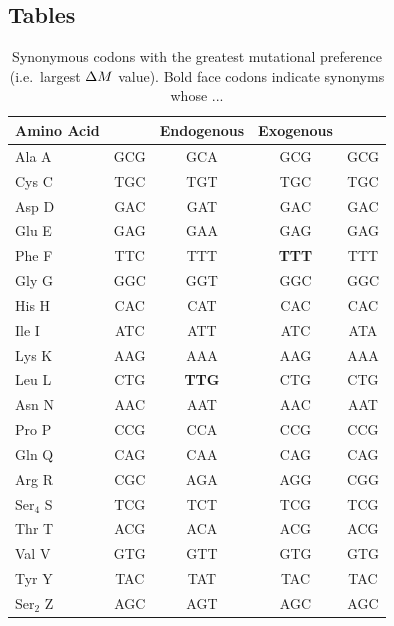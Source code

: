 \documentclass[12pt]{article}
\begin{document}
\subsection*{Tables}
\begin{table}
    \centering
\begin{tabular}{  l  c  c  c  c  }
\hline
	Amino Acid & \gossypii & Endogenous & Exogenous & \kluyveri \\ \hline \hline
	Ala A & GCG & GCA & GCG & GCG \\ \hline
	Cys C & TGC & TGT & TGC & TGC \\ \hline
	Asp D & GAC & GAT & GAC & GAC \\ \hline
	Glu E & GAG & GAA & GAG & GAG \\ \hline
	Phe F & TTC & TTT & \textbf{TTT} & TTT \\ \hline
	Gly G & GGC & GGT & GGC & GGC \\ \hline
	His H & CAC & CAT & CAC & CAC \\ \hline
	Ile I & ATC & ATT & ATC & ATA \\ \hline
	Lys K & AAG & AAA & AAG & AAA \\ \hline
	Leu L & CTG & \textbf{TTG} & CTG & CTG \\ \hline
	Asn N & AAC & AAT & AAC & AAT \\ \hline
	Pro P & CCG & CCA & CCG & CCG \\ \hline
	Gln Q & CAG & CAA & CAG & CAG \\ \hline
	Arg R & CGC & AGA & AGG & CGG \\ \hline
	Ser$_4$ S & TCG & TCT & TCG & TCG \\ \hline
	Thr T & ACG & ACA & ACG & ACG \\ \hline
	Val V & GTG & GTT & GTG & GTG \\ \hline
	Tyr Y & TAC & TAT & TAC & TAC \\ \hline
	Ser$_2$ Z & AGC & AGT & AGC & AGC \\ \hline
\end{tabular}
\caption{Synonymous codons with the greatest mutational preference (i.e.~largest ${\Delta M}$ value).
Bold face codons indicate synonyms whose ...
}
    \label{tab:codon_pref_dm}
\end{table}

\clearpage
\end{document}

